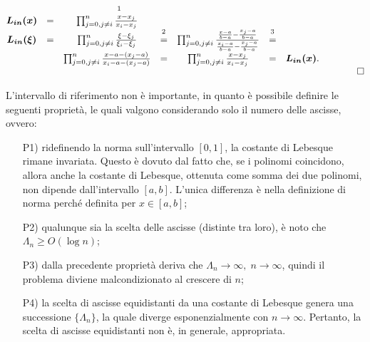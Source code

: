 \begin{equation*}
    \begin{matrix}
        \boldsymbol{L_{in}(x)} &=&\prod_{j=0, j\neq i}^n\frac{\overset{\footnotemark}{x}-x_j}{x_i-x_j}&&&&&&\\
        \boldsymbol{L_{in}(\xi)} &=& \prod_{j=0,j\neq i}^n\frac{\xi-\xi_j}{\xi_i-\xi_j}&\overset{\footnotemark}{=}&\prod_{j=0, j\neq i}^n\frac{\frac{x-a}{b-a}-\frac{x_j-a}{b-a}}{\frac{x_i-a}{b-a}-\frac{x_j-a}{b-a}}&\overset{\footnotemark}{=}&\\
        &&\prod_{j=0,j\neq i}^n\frac{x-a-(x_j-a)}{x_i-a-(x_j-a)}&=&\prod_{j=0,j\neq i}^n\frac{x-x_j}{x_i-x_j}&=&\boldsymbol{L_{in}(x)}.\\
        &&&&&&&&\qed
    \end{matrix}
\end{equation*}

\addtocounter{footnote}{-2}



L'intervallo di riferimento non è importante, in quanto è possibile definire le seguenti proprietà, le quali valgono considerando solo il numero delle ascisse, ovvero:

\begin{itemize}
    \item [P1)] ridefinendo la norma sull'intervallo $[0,1]$, la costante di Lebesque rimane invariata. Questo è dovuto dal fatto che, se i polinomi coincidono, allora anche la costante di Lebesque, ottenuta come somma dei due polinomi, non dipende dall'intervallo $[a,b]$. L'unica differenza è nella definizione di norma perché definita per $x\in[a,b]$;
    \item [P2)] qualunque sia la scelta delle ascisse (distinte tra loro), è noto che $\Lambda_n\geq O(\log n)$;
    \item[P3)] dalla precedente proprietà deriva che $\Lambda_n\rightarrow\infty,\; n\rightarrow\infty$, quindi il problema diviene malcondizionato al crescere di $n$;
    \item[P4)] la scelta di ascisse equidistanti da una costante di Lebesque genera una successione $\{\Lambda_n\}$, la quale diverge esponenzialmente con $n\rightarrow\infty$. Pertanto, la scelta di ascisse equidistanti non è, in generale, appropriata.
\end{itemize}

